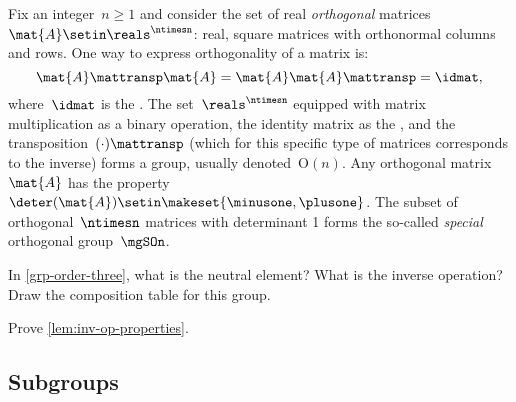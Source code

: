 \begin{example}

    Fix an integer~$n\geq 1$ and consider the set of real \emph{orthogonal} matrices~$\mat{A}\setin \reals^{\ntimesn}$:
    real, square matrices with orthonormal columns and rows.
    One way to express orthogonality of a matrix is:
    \begin{equation}
        \mat{A}\mattransp \mat{A}=\mat{A}\mat{A}\mattransp = \idmat,
    \end{equation}
    where~$\idmat$ is the .
    The set~$\reals^{\ntimesn}$ equipped with matrix multiplication as a binary operation, the identity matrix as the , and the transposition~$(\cdot)\mattransp$ (which for this specific type of matrices corresponds to the inverse) forms a group, usually denoted~$\text{O}(n)$.
    Any orthogonal matrix~$\mat{A}$ has the property~$\deter(\mat{A})\setin \makeset{\minusone,\plusone}$.
    The subset of orthogonal~$\ntimesn$ matrices with determinant 1 forms the so-called \emph{special} orthogonal group~$\mgSOn$.
\end{example}

\vfill%

\begin{gradedexercise}
    \label{ex:GroupWithThreeElements}
    In \cref{grp-order-three}, what is the neutral element?
    What is the inverse operation?
    Draw the composition table for this group.
\end{gradedexercise}


\begin{gradedexercise}
    \label{ex:GroupInverseProperties}
    Prove \cref{lem:inv-op-properties}.
\end{gradedexercise}


\subsection{Subgroups}


